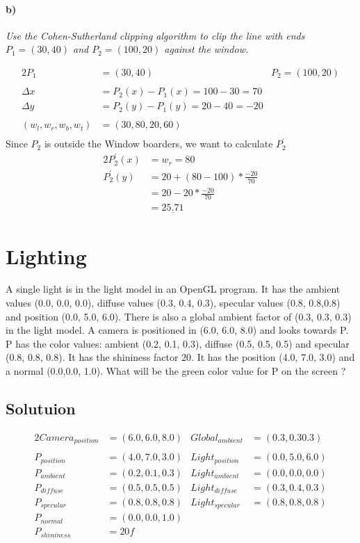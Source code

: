 \documentclass[12pt,fleqn,reqno]{article}
\begin{document}
\paragraph{b)}
\emph{Use the Cohen-Sutherland clipping algorithm to clip the line with ends \(P_1=(30, 40)\) and \(P_2=(100, 20)\) against the window.}


\begin{alignat*}{2}
	P_1 		&= (30,40) &P_2 = (100,20)\\
	\\
	\Delta x 	&= P_2(x) - P_1(x) = 100 -30 = 70\\
	\Delta y	&= P_2(y) - P_1(y) = 20 -40 = -20 \\
	\\
	(w_l,w_r,w_b,w_t) &= (30,80,20,60)\\
\end{alignat*}
Since \(P_2\) is outside the Window boarders, we want to calculate \( P_{2}^{'} \)
\begin{alignat*}{2}
	 P_{2}^{'}(x) &= w_r = 80\\
	 P_{2}^{'}(y) &= 20 + (80 -100) * \frac{-20}{70}\\
	  	&= 20 - 20 *  \frac{-20}{70}\\
		&=  \underline{25.71}
\end{alignat*}

\section{Lighting}
A single light is in the light model in an OpenGL program. It has the ambient values (0.0, 0.0, 0.0), diffuse values (0.3, 0.4, 0.3), specular values (0.8, 0.8,0.8) and position (0.0, 5.0, 6.0). There is also a global ambient factor of (0.3, 0.3, 0.3) in the light model.
A camera is positioned in (6.0, 6.0, 8.0) and looks towards P.
P has the color values:
ambient (0.2, 0.1, 0.3), diffuse (0.5, 0.5, 0.5) and specular (0.8, 0.8, 0.8). It has the shininess factor 20. It has the position (4.0, 7.0, 3.0) and a normal (0.0,0.0, 1.0).
What will be the green color value for P on the screen ?

\subsection{Solutuion}
\begin{alignat*}{2}
	Camera_{position}	&= (6.0, 6.0, 8.0)
	&Global_{ambient}	&= (0.3, 0.3 0.3) \\
	\\
	P_{position}		&=  (4.0, 7.0, 3.0)
	&Light_{position}	&= (0.0, 5.0, 6.0)\\
	P_{ambient}		&= (0.2, 0.1, 0.3)
	&Light_{ambient}	&= (0.0, 0.0, 0.0)\\
	P_{diffuse}		&= (0.5, 0.5, 0.5)
	&Light_{diffuse}	&= (0.3, 0.4, 0.3)\\
	P_{specular}		&= (0.8, 0.8, 0.8)
	&Light_{specular}	&= (0.8, 0.8,0.8)\\
	P_{normal}		&=  (0.0,0.0, 1.0)\\
	P_{shininess}		&=  20f\\
\end{alignat*}
\end{document}
